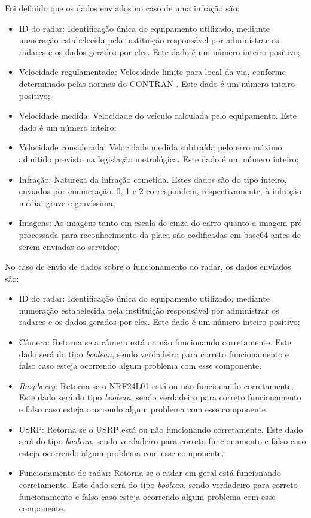 Foi definido que os dados enviados no caso de uma infração são: 

    \begin{itemize}
        \item ID do radar: Identificação única do equipamento utilizado, mediante numeração estabelecida pela instituição responsável por administrar os radares e os dados gerados por eles. Este dado é um número inteiro positivo;
        \item Velocidade regulamentada: Velocidade limite para  local da via, conforme determinado pelas normas do CONTRAN \cite{contranVI}. Este dado é um número inteiro positivo;
        \item Velocidade medida: Velocidade  do veículo calculada pelo equipamento. Este dado é um número inteiro;
        \item Velocidade considerada: Velocidade medida subtraída pelo erro máximo admitido previsto na legislação metrológica. Este dado é um número inteiro;
        \item Infração: Natureza da infração cometida. Estes dados são do tipo inteiro, enviados por enumeração. 0, 1 e 2 correspondem, respectivamente, à infração média, grave e gravíssima;
        \item Imagens: As imagens tanto em escala de cinza do carro quanto a imagem pré processada para reconhecimento da placa são codificadas em base64 antes de serem enviadas ao servidor;
        \end{itemize}
        
No caso de envio de dados sobre o funcionamento do radar, os dados enviados são:
    \begin{itemize}
        \item ID do radar: Identificação única do equipamento utilizado, mediante numeração estabelecida pela instituição responsável por administrar os radares e os dados gerados por eles. Este dado é um número inteiro positivo;
        \item Câmera: Retorna se a câmera está ou não funcionando corretamente. Este dado será do tipo \emph{boolean}, sendo verdadeiro para correto funcionamento e falso caso esteja ocorrendo algum problema com esse componente. 
        \item \emph{Raspberry}: Retorna se o NRF24L01 está ou não funcionando corretamente. Este dado será do tipo \emph{boolean}, sendo verdadeiro para correto funcionamento e falso caso esteja ocorrendo algum problema com esse componente.
        \item USRP: Retorna se o USRP está ou não funcionando corretamente.  Este dado será do tipo \emph{boolean}, sendo verdadeiro para correto funcionamento e falso caso esteja ocorrendo algum problema com esse componente.
        \item Funcionamento do radar: Retorna se o radar em geral está funcionando corretamente. Este dado será do tipo \emph{boolean}, sendo verdadeiro para correto funcionamento e falso caso esteja ocorrendo algum problema com esse componente.
        \end{itemize}
